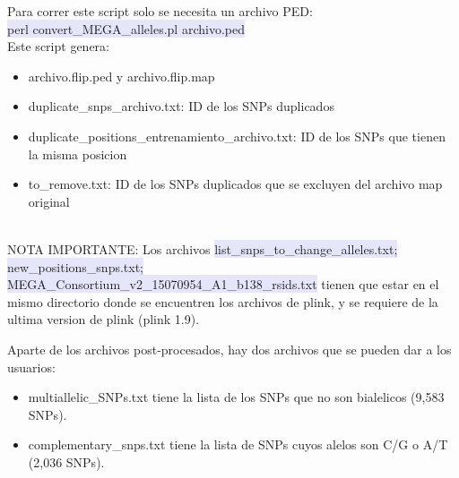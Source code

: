 \documentclass[10pt]{report}
\begin{document}
Para correr este script solo se necesita un archivo PED:\\
\colorbox{Lavender}{perl convert\_MEGA\_alleles.pl archivo.ped}\\

Este script genera:
\begin{itemize}
\item archivo.flip.ped y archivo.flip.map
\item duplicate\_snps\_archivo.txt: ID de los SNPs duplicados
\item duplicate\_positions\_entrenamiento\_archivo.txt: ID de los SNPs que tienen la misma posicion
\item to\_remove.txt: ID de los SNPs duplicados que se excluyen del archivo map original
\end{itemize}
\\

NOTA IMPORTANTE: Los archivos 
\colorbox{Lavender}{list\_snps\_to\_change\_alleles.txt; new\_positions\_snps.txt;}\\
\colorbox{Lavender}{MEGA\_Consortium\_v2\_15070954\_A1\_b138\_rsids.txt} tienen que estar en el mismo directorio donde se encuentren los archivos de plink, y se requiere de la ultima version de plink (plink 1.9).

Aparte de los archivos post-procesados, hay dos archivos que se pueden dar a los usuarios:
\begin{itemize}
\item multiallelic\_SNPs.txt tiene la lista de los SNPs que no son bialelicos (9,583 SNPs). 
\item complementary\_snps.txt tiene la lista de SNPs cuyos alelos son C/G o A/T (2,036 SNPs).
\end{itemize}
\end{document}
